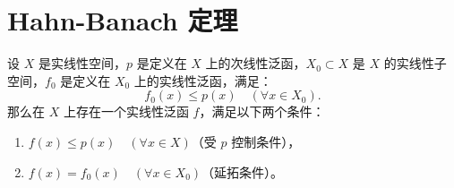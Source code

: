 \documentclass[lang=cn,newtx,10pt,scheme=chinese,thmcnt=chapter]{elegantbook}
\begin{document}
\section{Hahn-Banach 定理}
\begin{theorem}设 \( X \) 是实线性空间，\( p \) 是定义在 \( X \) 上的次线性泛函，\( X_0 \subset X \) 是 \( X \) 的实线性子空间，\( f_0 \) 是定义在 \( X_0 \) 上的实线性泛函，满足：
\[
f_0(x) \leqslant p(x) \quad (\forall x \in X_0).
\]
那么在 \( X \) 上存在一个实线性泛函 \( f \)，满足以下两个条件：
\begin{enumerate}
    \item \( f(x) \leqslant p(x) \quad (\forall x \in X) \)（受 \( p \) 控制条件），
    \item \( f(x) = f_0(x) \quad (\forall x \in X_0) \)（延拓条件）。
\end{enumerate}

\end{theorem}
\end{document}
